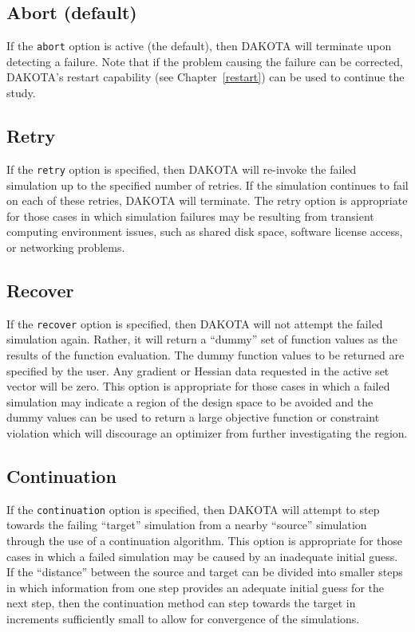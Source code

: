 \subsection{Abort (default)}\label{failure:mitigation:abort}

If the \texttt{abort} option is active (the default), then DAKOTA will
terminate upon detecting a failure. Note that if the problem causing
the failure can be corrected, DAKOTA's restart capability (see
Chapter~\ref{restart}) can be used to continue the study.

\subsection{Retry}\label{failure:mitigation:retry}

If the \texttt{retry} option is specified, then DAKOTA will re-invoke
the failed simulation up to the specified number of retries. If the
simulation continues to fail on each of these retries, DAKOTA will
terminate. The retry option is appropriate for those cases in which
simulation failures may be resulting from transient computing
environment issues, such as shared disk space, software license
access, or networking problems.

\subsection{Recover}\label{failure:mitigation:recover}

If the \texttt{recover} option is specified, then DAKOTA will not
attempt the failed simulation again. Rather, it will return a ``dummy''
set of function values as the results of the function evaluation. The
dummy function values to be returned are specified by the user. Any
gradient or Hessian data requested in the active set vector will be
zero. This option is appropriate for those cases in which a failed
simulation may indicate a region of the design space to be avoided and
the dummy values can be used to return a large objective function or 
constraint violation which will discourage an optimizer from further
investigating the region.

\subsection{Continuation}\label{failure:mitigation:continuation}

If the \texttt{continuation} option is specified, then DAKOTA will
attempt to step towards the failing ``target'' simulation from a nearby
``source'' simulation through the use of a continuation algorithm. This
option is appropriate for those cases in which a failed simulation may
be caused by an inadequate initial guess. If the ``distance'' between
the source and target can be divided into smaller steps in which
information from one step provides an adequate initial guess for the
next step, then the continuation method can step towards the target in
increments sufficiently small to allow for convergence of the
simulations.

